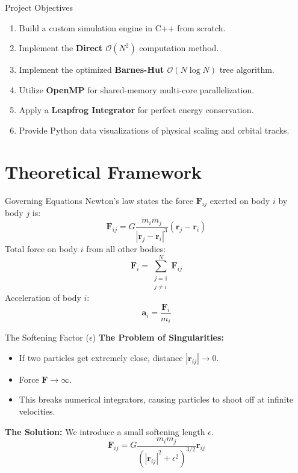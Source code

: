 \documentclass[aspectratio=169]{beamer}
\begin{document}
\begin{frame}{Project Objectives}
    \begin{enumerate}
        \item Build a custom simulation engine in C++ from scratch.
        \item Implement the \textbf{Direct $\mathcal{O}(N^2)$} computation method.
        \item Implement the optimized \textbf{Barnes-Hut $\mathcal{O}(N \log N)$} tree algorithm.
        \item Utilize \textbf{OpenMP} for shared-memory multi-core parallelization.
        \item Apply a \textbf{Leapfrog Integrator} for perfect energy conservation.
        \item Provide Python data visualizations of physical scaling and orbital tracks.
    \end{enumerate}
\end{frame}

\section{Theoretical Framework}
\begin{frame}{Governing Equations}
    Newton's law states the force $\mathbf{F}_{ij}$ exerted on body $i$ by body $j$ is:
    \begin{equation*}
        \mathbf{F}_{ij} = G \frac{m_i m_j}{|\mathbf{r}_j - \mathbf{r}_i|^3} (\mathbf{r}_j - \mathbf{r}_i)
    \end{equation*}
    Total force on body $i$ from all other bodies:
    \begin{equation*}
        \mathbf{F}_i = \sum_{\substack{j=1 \\ j \neq i}}^{N} \mathbf{F}_{ij}
    \end{equation*}
    Acceleration of body $i$:
    \begin{equation*}
        \mathbf{a}_i = \frac{\mathbf{F}_i}{m_i}
    \end{equation*}
\end{frame}

\begin{frame}{The Softening Factor ($\epsilon$)}
    \textbf{The Problem of Singularities:}
    \begin{itemize}
        \item If two particles get extremely close, distance $|\mathbf{r}_{ij}| \to 0$.
        \item Force $\mathbf{F} \to \infty$.
        \item This breaks numerical integrators, causing particles to shoot off at infinite velocities.
    \end{itemize}
    \textbf{The Solution:} We introduce a small softening length $\epsilon$.
    \begin{equation*}
        \mathbf{F}_{ij} = G \frac{m_i m_j}{(|\mathbf{r}_{ij}|^2 + \epsilon^2)^{3/2}} \mathbf{r}_{ij}
    \end{equation*}
\end{frame}
\end{document}
